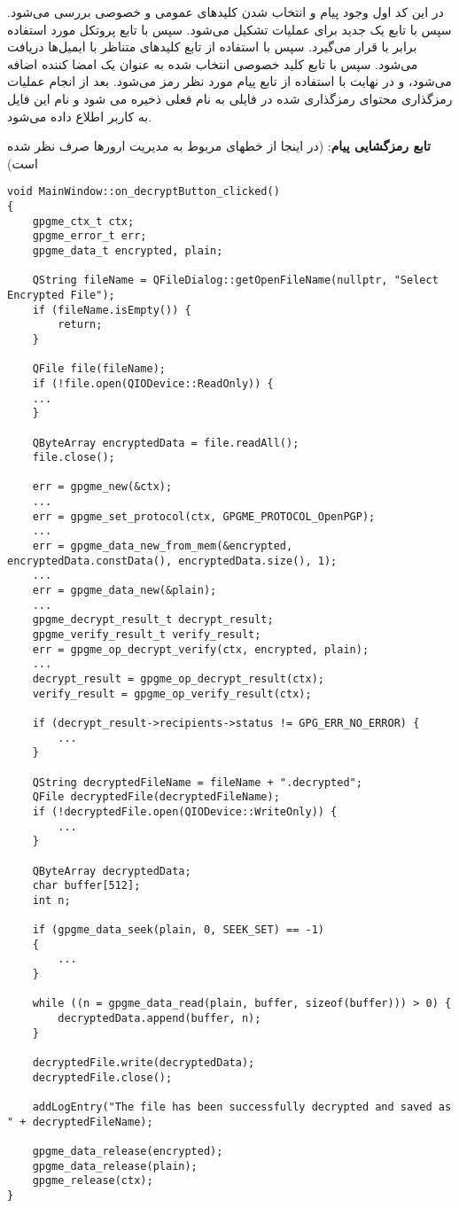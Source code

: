 \documentclass{report}
\begin{document}
در این کد اول وجود پیام و انتخاب شدن کلیدهای عمومی و خصوصی بررسی می‌شود. سپس با تابع  یک  جدید برای عملیات تشکیل می‌شود. سپس با تابع  پروتکل مورد استفاده برابر با  قرار می‌گیرد. سپس با استفاده از تابع  کلیدهای متناظر با ایمیل‌ها دریافت می‌شود. سپس با تابع  کلید خصوصی انتخاب شده به عنوان یک امضا کننده اضافه می‌شود، و در نهایت با استفاده از تابع  پیام مورد نظر رمز می‌شود. بعد از انجام عملیات رمزگذاری محتوای رمزگذاری شده در فایلی به نام  فعلی ذخیره می شود و نام این فایل به کاربر اطلاع داده می‌شود.

\textbf{تابع رمزگشایی پیام}:
(در اینجا از خطهای مربوط به مدیریت ارورها صرف نظر شده است)
\begin{LTR}
    \begin{verbatim}
void MainWindow::on_decryptButton_clicked()
{
    gpgme_ctx_t ctx;
    gpgme_error_t err;
    gpgme_data_t encrypted, plain;
    
    QString fileName = QFileDialog::getOpenFileName(nullptr, "Select Encrypted File");
    if (fileName.isEmpty()) {
        return;
    }
    
    QFile file(fileName);
    if (!file.open(QIODevice::ReadOnly)) {
    ...
    }
    
    QByteArray encryptedData = file.readAll();
    file.close();
    
    err = gpgme_new(&ctx);
    ...
    err = gpgme_set_protocol(ctx, GPGME_PROTOCOL_OpenPGP);
    ...
    err = gpgme_data_new_from_mem(&encrypted, encryptedData.constData(), encryptedData.size(), 1);
    ...
    err = gpgme_data_new(&plain);
    ...
    gpgme_decrypt_result_t decrypt_result;
    gpgme_verify_result_t verify_result;
    err = gpgme_op_decrypt_verify(ctx, encrypted, plain);
    ...
    decrypt_result = gpgme_op_decrypt_result(ctx);
    verify_result = gpgme_op_verify_result(ctx);
    
    if (decrypt_result->recipients->status != GPG_ERR_NO_ERROR) {
        ...
    }
    
    QString decryptedFileName = fileName + ".decrypted";
    QFile decryptedFile(decryptedFileName);
    if (!decryptedFile.open(QIODevice::WriteOnly)) {
        ...
    }
    
    QByteArray decryptedData;
    char buffer[512];
    int n;
    
    if (gpgme_data_seek(plain, 0, SEEK_SET) == -1)
    {
        ...
    }
    
    while ((n = gpgme_data_read(plain, buffer, sizeof(buffer))) > 0) {
        decryptedData.append(buffer, n);
    }
    
    decryptedFile.write(decryptedData);
    decryptedFile.close();
    
    addLogEntry("The file has been successfully decrypted and saved as " + decryptedFileName);
    
    gpgme_data_release(encrypted);
    gpgme_data_release(plain);
    gpgme_release(ctx);
}
    \end{verbatim}
\end{LTR}
\end{document}
